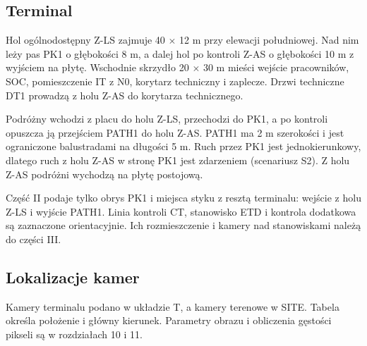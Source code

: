\subsection*{Terminal}
Hol ogólnodostępny Z-LS zajmuje 40 $\times$ 12 m przy elewacji południowej. Nad nim leży pas PK1 o głębokości 8 m, a dalej hol po kontroli Z-AS o głębokości 10 m z wyjściem na płytę. Wschodnie skrzydło 20 $\times$ 30 m mieści wejście pracowników, SOC, pomieszczenie IT z N0, korytarz techniczny i zaplecze. Drzwi techniczne DT1 prowadzą z holu Z-AS do korytarza technicznego.

Podróżny wchodzi z placu do holu Z-LS, przechodzi do PK1, a po kontroli opuszcza ją przejściem PATH1 do holu Z-AS. PATH1 ma 2 m szerokości i jest ograniczone balustradami na długości 5 m. Ruch przez PK1 jest jednokierunkowy, dlatego ruch z holu Z-AS w stronę PK1 jest zdarzeniem (scenariusz S2). Z holu Z-AS podróżni wychodzą na płytę postojową.

Część II podaje tylko obrys PK1 i miejsca styku z resztą terminalu: wejście z holu Z-LS i wyjście PATH1. Linia kontroli CT, stanowisko ETD i kontrola dodatkowa są zaznaczone orientacyjnie. Ich rozmieszczenie i kamery nad stanowiskami należą do części III.


\subsection*{Lokalizacje kamer}
Kamery terminalu podano w układzie T, a kamery terenowe w SITE. Tabela określa położenie i główny kierunek. Parametry obrazu i obliczenia gęstości pikseli są w rozdziałach 10 i 11.

